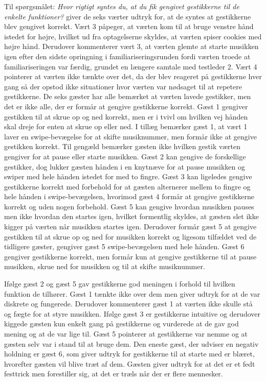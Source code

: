Til spørgsmålet: \textit{Hvor rigtigt syntes du, at du fik gengivet gestikkerne til de enkelte funktioner?} giver de seks værter udtryk for, at de syntes at gestikkerne blev gengivet korrekt. Vært 3 påpeger, at værten kom til at bruge venstre hånd istedet for højre, hvilket ud fra optagelserne skyldes, at værten spiser cookies med højre hånd. Derudover kommenterer vært 3, at værten glemte at starte musikken igen efter den sidste opringning i familiariseringsrunden fordi værten troede at familiariseringen var færdig, grundet en længere samtale med testleder 2. Vært 4 pointerer at værten ikke tænkte over det, da der blev reageret på gestikkerne hver gang så der opstod ikke situationer hvor værten var nødsaget til at repetere gestikkerne. \blankline
%
De seks gæster har alle bemærket at værten lavede gestikker, men det er ikke alle, der er formår at gengive gestikkerne korrekt. Gæst 1 gengiver gestikken til at skrue op og ned korrekt, men er i tvivl om hvilken vej hånden skal dreje for enten at skrue op eller ned. I tillæg bemærker gæst 1, at vært 1 laver en swipe-bevægelse for at skifte musiknummer, men formår ikke at gengive gestikken korrekt. Til gengæld bemærker gæsten ikke hvilken gestik værten gengiver for at pause eller starte musikken. Gæst 2 kan gengive de forskellige gestikker, dog lukker gæsten hånden i en knytnæve for at pause musikken og swiper med hele hånden istedet for med to fingre. Gæst 3 kan ligeledes gengive gestikkerne korrekt med forbehold for at gæsten alternerer mellem to fingre og hele hånden i swipe-bevægelsen, hvorimod gæst 4 formår at gengive gestikkerne korrekt og uden nogen forbehold. Gæst 5 kan gengive hvordan musikken pauses men ikke hvordan den startes igen, hvilket formentlig skyldes, at gæsten slet ikke kigger på værten når musikken startes igen. Derudover formår gæst 5 at gengive gestikken til at skrue op og ned for musikken korrekt og ligesom tilfældet ved de tidligere gæster, gengiver gæst 5 swipe-bevægelsen med hele hånden. Gæst 6 gengiver gestikkerne korrekt, men formår kun at gengive gestikkerne til at pause musikken, skrue ned for musikken og til at skifte musiknummer. 

Ifølge gæst 2 og gæst 5 gav gestikkerne god meningen i forhold til hvilken funktion de tilhører. Gæst 1 tænkte ikke over dem men giver udtryk for at de var diskrete og fungerede. Derudover kommenterer gæst 1 at værten ikke skulle stå og fægte for at styre musikken. Ifølge gæst 3 er gestikkerne intuitive og derudover kiggede gæsten kun enkelt gang på gestikkerne og vurderede at de gav god mening og at de var lige til. Gæst 5 pointerer at gestikkerne var nemme og at gæsten selv var i stand til at bruge dem. Den eneste gæst, der udviser en negativ holdning er gæst 6, som giver udtryk for gestikkerne til at starte med er blæret, hvorefter gæsten vil blive træt af dem. Gæsten giver udtryk for at det er et fedt festtrick men forestiller sig, at det er træls når der er flere mennesker.
%
